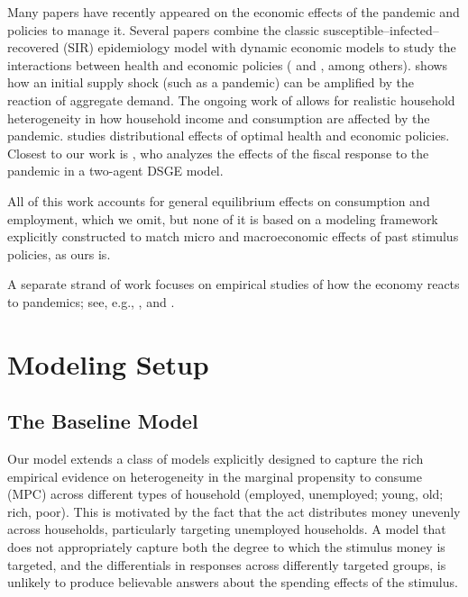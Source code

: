 \documentclass[titlepage]{\econtex}
\begin{document}
Many papers have recently appeared on the economic effects of the pandemic and policies to manage it.
Several papers combine the classic susceptible--infected--recovered (SIR) epidemiology model with dynamic economic models to study the interactions between health and economic policies (\cite{ert_covid} and \cite{aal_covid}, among others).
\cite{covidMacroImpl} shows how an initial supply shock (such as a pandemic) can be amplified by the reaction of aggregate demand.
The ongoing work of \cite{kmv_pandemics} allows for realistic household heterogeneity in how household income and consumption are affected by the pandemic.
\cite{healthWealth} studies distributional effects of optimal health and economic policies.
Closest to our work is \cite{faria_FPpandemic}, who analyzes the effects of the fiscal response to the pandemic in a two-agent DSGE model.

All of this work accounts for general equilibrium effects on consumption and employment, which we omit, but none of it is based on a modeling framework explicitly constructed to match micro and macroeconomic effects of past stimulus policies, as ours is.

A separate strand of work focuses on empirical studies of how the economy reacts to pandemics; see, e.g., \cite{baker_Cpandemic}, \cite{jorda_pandemics} and \cite{verner_pandemics}.

\section{Modeling Setup}

\subsection{The Baseline Model}

Our model extends a class of models explicitly designed to capture the rich empirical evidence on heterogeneity in the marginal propensity to consume (MPC) across different types of household (employed, unemployed; young, old; rich, poor).  This is motivated by the fact that the act distributes money unevenly across households, particularly targeting unemployed households.  A model that does not appropriately capture both the degree to which the stimulus money is targeted, and the differentials in responses across differently targeted groups, is unlikely to produce believable answers about the spending effects of the stimulus.
\end{document}
